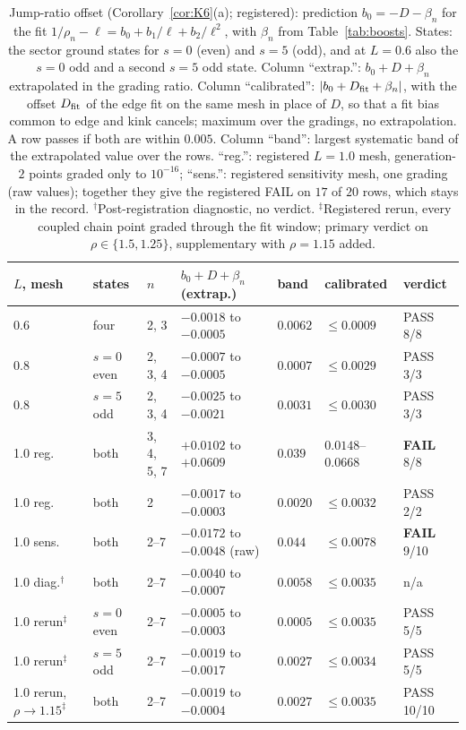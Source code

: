 \documentclass[11pt]{amsart}
\theoremstyle{definition}
\theoremstyle{remark}
\numberwithin{equation}{section}
\begin{document}
\begin{table}[ht]\centering\footnotesize\setlength\tabcolsep{3pt}
\caption{Jump-ratio offset (Corollary~\ref{cor:K6}(a); registered): prediction $b_0=-D-\beta_n$ for the fit $1/\rho_n-\ell=b_0+b_1/\ell+b_2/\ell^2$, with $\beta_n$ from Table~\ref{tab:boosts}. States: the sector ground states for $s=0$ (even) and $s=5$ (odd), and at $L=0.6$ also the $s=0$ odd and a second $s=5$ odd state. Column ``extrap.'': $b_0+D+\beta_n$ extrapolated in the grading ratio. Column ``calibrated'': $|b_0+D_{\rm fit}+\beta_n|$, with the offset $D_{\rm fit}$ of the edge fit on the same mesh in place of $D$, so that a fit bias common to edge and kink cancels; maximum over the gradings, no extrapolation. A row passes if both are within $0.005$. Column ``band'': largest systematic band of the extrapolated value over the rows. ``reg.'': registered $L=1.0$ mesh, generation-$2$ points graded only to $10^{-16}$; ``sens.'': registered sensitivity mesh, one grading (raw values); together they give the registered FAIL on $17$ of $20$ rows, which stays in the record. $^\dagger$Post-registration diagnostic, no verdict. $^\ddagger$Registered rerun, every coupled chain point graded through the fit window; primary verdict on $\rho\in\{1.5,1.25\}$, supplementary with $\rho=1.15$ added.}\label{tab:k5}
\begin{tabular}{lllllll}
\toprule
$L$, mesh & states & $n$ & $b_0+D+\beta_n$ (extrap.) & band & calibrated & verdict\\
\midrule
0.6 & four & 2, 3 & $-0.0018$ to $-0.0005$ & $0.0062$ & $\le0.0009$ & PASS 8/8\\
0.8 & $s=0$ even & 2, 3, 4 & $-0.0007$ to $-0.0005$ & $0.0007$ & $\le0.0029$ & PASS 3/3\\
0.8 & $s=5$ odd & 2, 3, 4 & $-0.0025$ to $-0.0021$ & $0.0031$ & $\le0.0030$ & PASS 3/3\\
1.0 reg. & both & 3, 4, 5, 7 & $+0.0102$ to $+0.0609$ & $0.039$ & $0.0148$--$0.0668$ & \textbf{FAIL} 8/8\\
1.0 reg. & both & 2 & $-0.0017$ to $-0.0003$ & $0.0020$ & $\le0.0032$ & PASS 2/2\\
1.0 sens. & both & 2--7 & $-0.0172$ to $-0.0048$ (raw) & $0.044$ & $\le0.0078$ & \textbf{FAIL} 9/10\\
1.0 diag.$^\dagger$ & both & 2--7 & $-0.0040$ to $-0.0007$ & $0.0058$ & $\le0.0035$ & n/a\\
1.0 rerun$^\ddagger$ & $s=0$ even & 2--7 & $-0.0005$ to $-0.0003$ & $0.0005$ & $\le0.0035$ & PASS 5/5\\
1.0 rerun$^\ddagger$ & $s=5$ odd & 2--7 & $-0.0019$ to $-0.0017$ & $0.0027$ & $\le0.0034$ & PASS 5/5\\
1.0 rerun, $\rho\to1.15^\ddagger$ & both & 2--7 & $-0.0019$ to $-0.0004$ & $0.0027$ & $\le0.0035$ & PASS 10/10\\
\bottomrule
\end{tabular}
\end{table}
\end{document}
